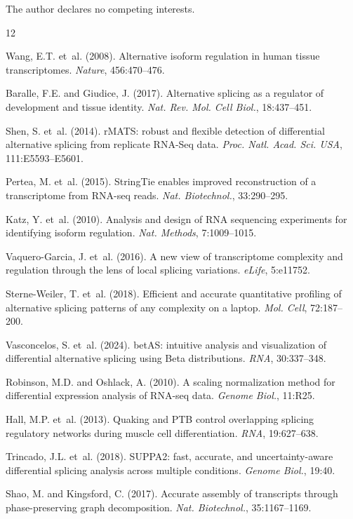 \documentclass[10pt]{article}
\begin{document}
The author declares no competing interests.


\begin{thebibliography}{12}

Wang, E.T. et~al. (2008).
Alternative isoform regulation in human tissue transcriptomes.
\textit{Nature}, 456:470--476.

Baralle, F.E. and Giudice, J. (2017).
Alternative splicing as a regulator of development and tissue identity.
\textit{Nat. Rev. Mol. Cell Biol.}, 18:437--451.

Shen, S. et~al. (2014).
rMATS: robust and flexible detection of differential alternative splicing from replicate RNA-Seq data.
\textit{Proc. Natl. Acad. Sci. USA}, 111:E5593--E5601.

Pertea, M. et~al. (2015).
StringTie enables improved reconstruction of a transcriptome from RNA-seq reads.
\textit{Nat. Biotechnol.}, 33:290--295.

Katz, Y. et~al. (2010).
Analysis and design of RNA sequencing experiments for identifying isoform regulation.
\textit{Nat. Methods}, 7:1009--1015.

Vaquero-Garcia, J. et~al. (2016).
A new view of transcriptome complexity and regulation through the lens of local splicing variations.
\textit{eLife}, 5:e11752.

Sterne-Weiler, T. et~al. (2018).
Efficient and accurate quantitative profiling of alternative splicing patterns of any complexity on a laptop.
\textit{Mol. Cell}, 72:187--200.

Vasconcelos, S. et~al. (2024).
betAS: intuitive analysis and visualization of differential alternative splicing using Beta distributions.
\textit{RNA}, 30:337--348.

Robinson, M.D. and Oshlack, A. (2010).
A scaling normalization method for differential expression analysis of RNA-seq data.
\textit{Genome Biol.}, 11:R25.

Hall, M.P. et~al. (2013).
Quaking and PTB control overlapping splicing regulatory networks during muscle cell differentiation.
\textit{RNA}, 19:627--638.

Trincado, J.L. et~al. (2018).
SUPPA2: fast, accurate, and uncertainty-aware differential splicing analysis across multiple conditions.
\textit{Genome Biol.}, 19:40.

Shao, M. and Kingsford, C. (2017).
Accurate assembly of transcripts through phase-preserving graph decomposition.
\textit{Nat. Biotechnol.}, 35:1167--1169.

\end{thebibliography}
\end{document}
